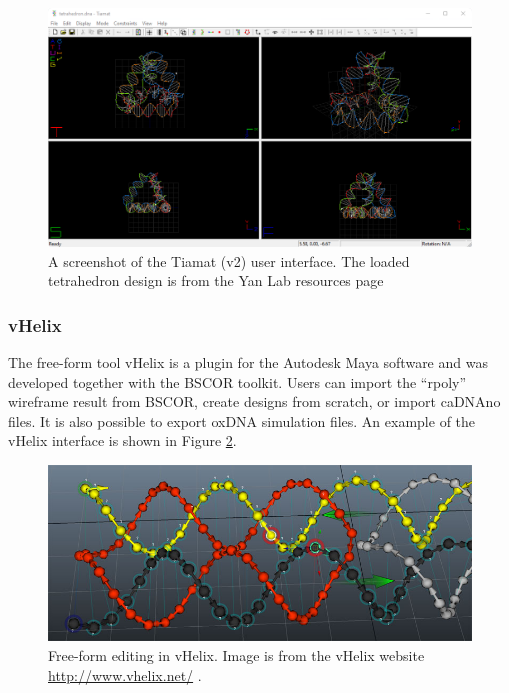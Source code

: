 \begin{figure}[h]
  \begin{center}
    \includegraphics[width=\textwidth]{figures/tiamat_ui.png}
    \caption{A screenshot of the Tiamat \cite{Tiamat} (v2) user interface. The loaded tetrahedron design is from the Yan Lab resources page \cite{tiamatWeb}}
    \label{fig:tiamat}
  \end{center}
\end{figure}

\subsubsection{vHelix}
The free-form tool vHelix \cite{vHelix} is a plugin for the Autodesk Maya software and was developed together with the BSCOR toolkit. Users can import the ``rpoly'' wireframe result from BSCOR, create designs from scratch, or import caDNAno files. It is also possible to export oxDNA simulation files. An example of the vHelix interface is shown in Figure \ref{fig:vhelix}. 

\begin{figure}[h]
  \begin{center}
    \includegraphics[width=\textwidth]{figures/vhelix.jpg}
    \caption{Free-form editing in vHelix. Image is from the vHelix website \url{http://www.vhelix.net/} \cite{vHelixWeb}.}
    \label{fig:vhelix}
  \end{center}
\end{figure}


